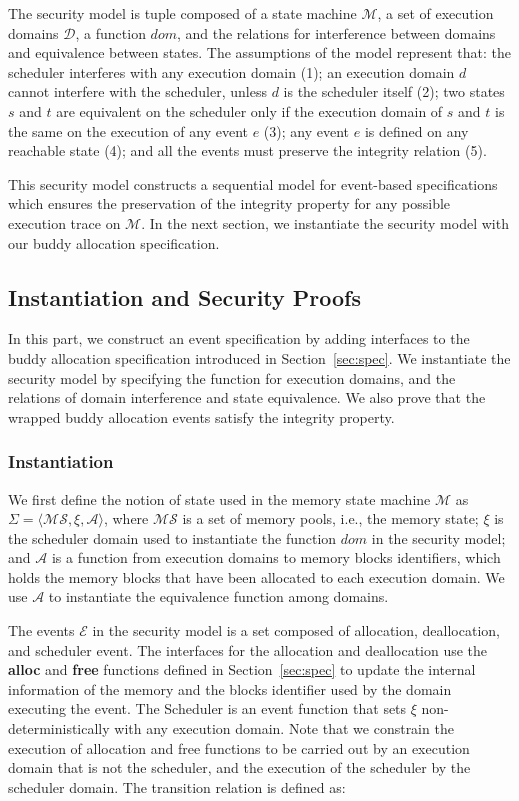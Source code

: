 The security model is tuple composed of a state machine $\mathcal{M}$, a set of execution domains $\mathcal{D}$, a function $dom$, and the relations for interference between domains and equivalence between states. The assumptions of the model represent that: the scheduler interferes with any execution domain (1); an execution domain $d$ cannot interfere with the scheduler, unless $d$ is the scheduler itself (2); two states $s$ and $t$ are equivalent on the scheduler only if the execution domain of $s$ and $t$ is the same on the execution of any event $e$ (3); any event $e$ is defined on any reachable state (4); and all the events must preserve the integrity relation (5).

This security model constructs a sequential model for event-based specifications which ensures the preservation of the integrity property for any possible execution trace on $\mathcal{M}$. In the next section, we instantiate the security model with our buddy allocation specification.

\subsection{Instantiation and Security Proofs}\label{sec:securityproof}
In this part, we construct an event specification by adding interfaces to the buddy allocation specification introduced in Section~\ref{sec:spec}. We instantiate the security model by specifying the function for execution domains, and the relations of domain interference and state equivalence. We also prove that the wrapped buddy allocation events satisfy the integrity property.

\subsubsection{Instantiation}
We first define the notion of state used in the memory state machine $\mathcal{M}$ as $\Sigma = \langle \mathcal{MS}, \xi, \mathcal{A} \rangle$, where $\mathcal{MS}$ is a set of memory pools, i.e., the memory state; $\xi$ is the scheduler domain used to instantiate the function $dom$ in the security model; and $\mathcal{A}$ is a function from execution domains to memory blocks identifiers, which holds the memory blocks that have been allocated to each execution domain. We use $\mathcal{A}$ to instantiate the equivalence function among domains.

The events $\mathcal{E}$ in the security model is a set composed of allocation, deallocation, and scheduler event. The interfaces for the allocation and deallocation use the \textbf{alloc} and \textbf{free} functions defined in Section~\ref{sec:spec} to update the internal information of the memory and the blocks identifier used by the domain executing the event. The Scheduler is an event function that sets $\xi$ non-deterministically with any execution domain. Note that we constrain the execution of allocation and free functions to be carried out by an execution domain that is not the scheduler, and the execution of the scheduler by the scheduler domain. The transition relation is defined as:

